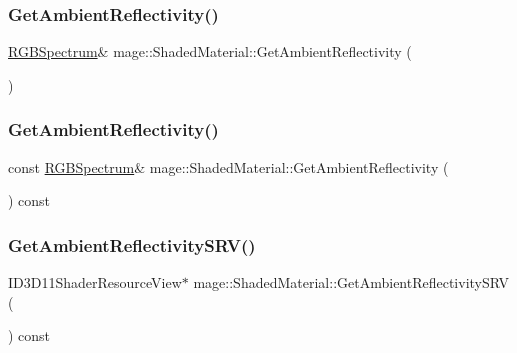 \subsubsection{\texorpdfstring{Get\+Ambient\+Reflectivity()}{GetAmbientReflectivity()}\hspace{0.1cm}{\footnotesize\ttfamily [1/2]}}
{\footnotesize\ttfamily \hyperlink{structmage_1_1_r_g_b_spectrum}{R\+G\+B\+Spectrum}\& mage\+::\+Shaded\+Material\+::\+Get\+Ambient\+Reflectivity (\begin{DoxyParamCaption}{ }\end{DoxyParamCaption})\hspace{0.3cm}{\ttfamily [noexcept]}}

\hypertarget{structmage_1_1_shaded_material_a4bb3403853e4d6ee9e443e575b33a755}{}\label{structmage_1_1_shaded_material_a4bb3403853e4d6ee9e443e575b33a755} 
\subsubsection{\texorpdfstring{Get\+Ambient\+Reflectivity()}{GetAmbientReflectivity()}\hspace{0.1cm}{\footnotesize\ttfamily [2/2]}}
{\footnotesize\ttfamily const \hyperlink{structmage_1_1_r_g_b_spectrum}{R\+G\+B\+Spectrum}\& mage\+::\+Shaded\+Material\+::\+Get\+Ambient\+Reflectivity (\begin{DoxyParamCaption}{ }\end{DoxyParamCaption}) const\hspace{0.3cm}{\ttfamily [noexcept]}}

\hypertarget{structmage_1_1_shaded_material_ae5e18984deccbd70ec76709e417b949f}{}\label{structmage_1_1_shaded_material_ae5e18984deccbd70ec76709e417b949f} 
\subsubsection{\texorpdfstring{Get\+Ambient\+Reflectivity\+S\+R\+V()}{GetAmbientReflectivitySRV()}}
{\footnotesize\ttfamily I\+D3\+D11\+Shader\+Resource\+View$\ast$ mage\+::\+Shaded\+Material\+::\+Get\+Ambient\+Reflectivity\+S\+RV (\begin{DoxyParamCaption}{ }\end{DoxyParamCaption}) const\hspace{0.3cm}{\ttfamily [noexcept]}}

